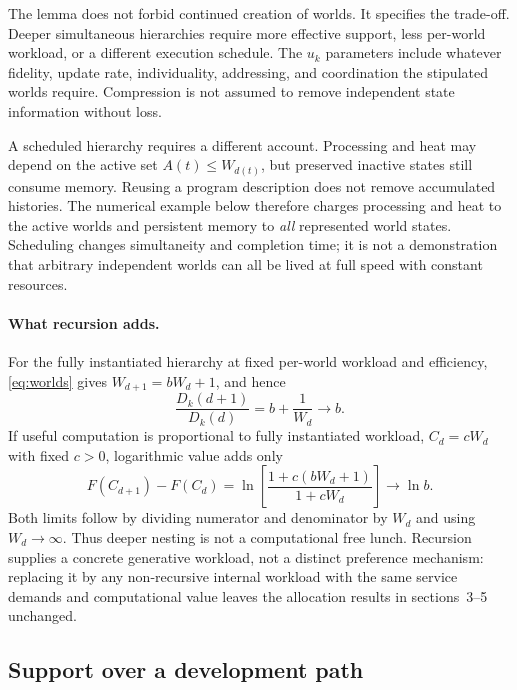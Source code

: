 \documentclass[11pt,a4paper]{article}
\theoremstyle{definition}\newtheorem{definition}{Definition}
\begin{document}
The lemma does not forbid continued creation of worlds. It specifies the trade-off. Deeper simultaneous hierarchies require more effective support, less per-world workload, or a different execution schedule. The $u_k$ parameters include whatever fidelity, update rate, individuality, addressing, and coordination the stipulated worlds require. Compression is not assumed to remove independent state information without loss.

A scheduled hierarchy requires a different account. Processing and heat may depend on the active set $A(t)\leq W_{d(t)}$, but preserved inactive states still consume memory. Reusing a program description does not remove accumulated histories. The numerical example below therefore charges processing and heat to the active worlds and persistent memory to \emph{all} represented world states. Scheduling changes simultaneity and completion time; it is not a demonstration that arbitrary independent worlds can all be lived at full speed with constant resources.


\paragraph{What recursion adds.}
For the fully instantiated hierarchy at fixed per-world workload and efficiency, \cref{eq:worlds} gives
$W_{d+1}=bW_d+1$, and hence
\begin{equation}
 \frac{D_k(d+1)}{D_k(d)}=b+\frac{1}{W_d}\longrightarrow b.
 \label{eq:recursion-cost}
\end{equation}
If useful computation is proportional to fully instantiated workload,
$C_d=cW_d$ with fixed $c>0$, logarithmic value adds only
\begin{equation}
 F(C_{d+1})-F(C_d)
 =\ln\!\left[\frac{1+c(bW_d+1)}{1+cW_d}\right]
 \longrightarrow\ln b.
 \label{eq:recursion-value}
\end{equation}
Both limits follow by dividing numerator and denominator by $W_d$ and
using $W_d\to\infty$. Thus deeper nesting is not a computational free
lunch. Recursion supplies a concrete generative workload, not a distinct
preference mechanism: replacing it by any non-recursive internal workload
with the same service demands and computational value leaves the allocation
results in sections~3--5 unchanged.

\subsection{Support over a development path}
\end{document}
